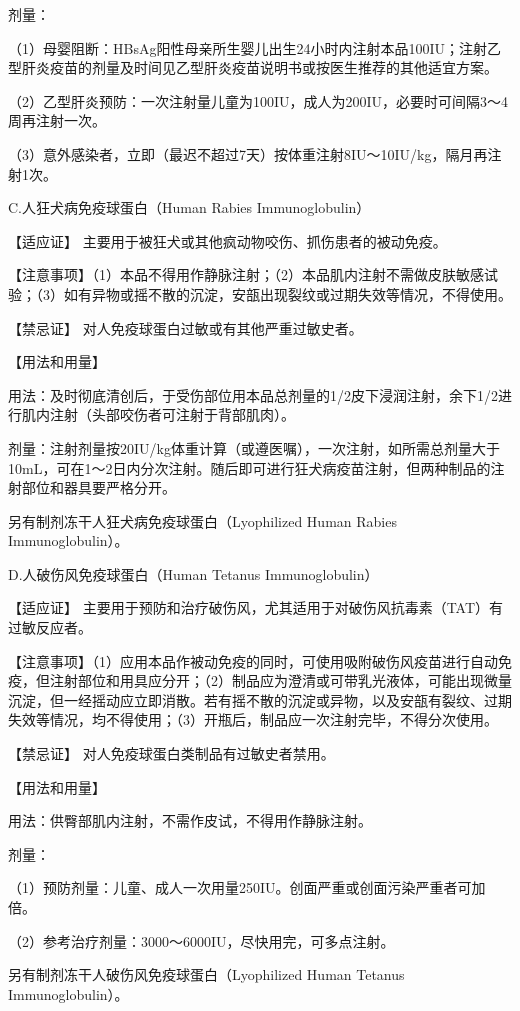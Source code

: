 剂量：

（1）母婴阻断：HBsAg阳性母亲所生婴儿出生24小时内注射本品100IU；注射乙型肝炎疫苗的剂量及时间见乙型肝炎疫苗说明书或按医生推荐的其他适宜方案。

（2）乙型肝炎预防：一次注射量儿童为100IU，成人为200IU，必要时可间隔3～4周再注射一次。

（3）意外感染者，立即（最迟不超过7天）按体重注射8IU～10IU/kg，隔月再注射1次。

C.人狂犬病免疫球蛋白（Human Rabies Immunoglobulin）

【适应证】 主要用于被狂犬或其他疯动物咬伤、抓伤患者的被动免疫。

【注意事项】（1）本品不得用作静脉注射；（2）本品肌内注射不需做皮肤敏感试验；（3）如有异物或摇不散的沉淀，安瓿出现裂纹或过期失效等情况，不得使用。

【禁忌证】 对人免疫球蛋白过敏或有其他严重过敏史者。

【用法和用量】

用法：及时彻底清创后，于受伤部位用本品总剂量的1/2皮下浸润注射，余下1/2进行肌内注射（头部咬伤者可注射于背部肌肉）。

剂量：注射剂量按20IU/kg体重计算（或遵医嘱），一次注射，如所需总剂量大于10mL，可在1～2日内分次注射。随后即可进行狂犬病疫苗注射，但两种制品的注射部位和器具要严格分开。

另有制剂冻干人狂犬病免疫球蛋白（Lyophilized Human Rabies
Immunoglobulin）。

D.人破伤风免疫球蛋白（Human Tetanus Immunoglobulin）

【适应证】
主要用于预防和治疗破伤风，尤其适用于对破伤风抗毒素（TAT）有过敏反应者。

【注意事项】（1）应用本品作被动免疫的同时，可使用吸附破伤风疫苗进行自动免疫，但注射部位和用具应分开；（2）制品应为澄清或可带乳光液体，可能出现微量沉淀，但一经摇动应立即消散。若有摇不散的沉淀或异物，以及安瓿有裂纹、过期失效等情况，均不得使用；（3）开瓶后，制品应一次注射完毕，不得分次使用。

【禁忌证】 对人免疫球蛋白类制品有过敏史者禁用。

【用法和用量】

用法：供臀部肌内注射，不需作皮试，不得用作静脉注射。

剂量：

（1）预防剂量：儿童、成人一次用量250IU。创面严重或创面污染严重者可加倍。

（2）参考治疗剂量：3000～6000IU，尽快用完，可多点注射。

另有制剂冻干人破伤风免疫球蛋白（Lyophilized Human Tetanus
Immunoglobulin）。

